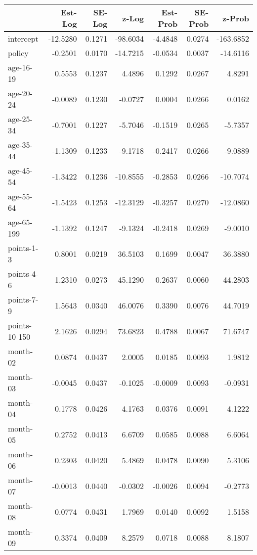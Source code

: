 \documentclass[10pt]{article}
\begin{document}
\begin{table}[ht]
\centering
\begin{tabular}{lrrrrrr}
  \hline
 & Est-Log & SE-Log & z-Log & Est-Prob & SE-Prob & z-Prob \\ 
  \hline
intercept & -12.5280 & 0.1271 & -98.6034 & -4.4848 & 0.0274 & -163.6852 \\ 
  policy & -0.2501 & 0.0170 & -14.7215 & -0.0534 & 0.0037 & -14.6116 \\ 
  age-16-19 & 0.5553 & 0.1237 & 4.4896 & 0.1292 & 0.0267 & 4.8291 \\ 
  age-20-24 & -0.0089 & 0.1230 & -0.0727 & 0.0004 & 0.0266 & 0.0162 \\ 
  age-25-34 & -0.7001 & 0.1227 & -5.7046 & -0.1519 & 0.0265 & -5.7357 \\ 
  age-35-44 & -1.1309 & 0.1233 & -9.1718 & -0.2417 & 0.0266 & -9.0889 \\ 
  age-45-54 & -1.3422 & 0.1236 & -10.8555 & -0.2853 & 0.0266 & -10.7074 \\ 
  age-55-64 & -1.5423 & 0.1253 & -12.3129 & -0.3257 & 0.0270 & -12.0860 \\ 
  age-65-199 & -1.1392 & 0.1247 & -9.1324 & -0.2418 & 0.0269 & -9.0010 \\ 
  points-1-3 & 0.8001 & 0.0219 & 36.5103 & 0.1699 & 0.0047 & 36.3880 \\ 
  points-4-6 & 1.2310 & 0.0273 & 45.1290 & 0.2637 & 0.0060 & 44.2803 \\ 
  points-7-9 & 1.5643 & 0.0340 & 46.0076 & 0.3390 & 0.0076 & 44.7019 \\ 
  points-10-150 & 2.1626 & 0.0294 & 73.6823 & 0.4788 & 0.0067 & 71.6747 \\ 
  month-02 & 0.0874 & 0.0437 & 2.0005 & 0.0185 & 0.0093 & 1.9812 \\ 
  month-03 & -0.0045 & 0.0437 & -0.1025 & -0.0009 & 0.0093 & -0.0931 \\ 
  month-04 & 0.1778 & 0.0426 & 4.1763 & 0.0376 & 0.0091 & 4.1222 \\ 
  month-05 & 0.2752 & 0.0413 & 6.6709 & 0.0585 & 0.0088 & 6.6064 \\ 
  month-06 & 0.2303 & 0.0420 & 5.4869 & 0.0478 & 0.0090 & 5.3106 \\ 
  month-07 & -0.0013 & 0.0440 & -0.0302 & -0.0026 & 0.0094 & -0.2773 \\ 
  month-08 & 0.0774 & 0.0431 & 1.7969 & 0.0140 & 0.0092 & 1.5158 \\ 
  month-09 & 0.3374 & 0.0409 & 8.2579 & 0.0718 & 0.0088 & 8.1807 \\ 

\end{tabular}
\end{table}
\end{document}
